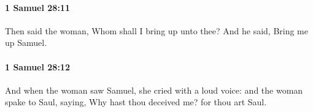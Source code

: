 		\paragraph{1 Samuel 28:11} %
			\label{1SAMUEL-28-11}

			Then said the woman, Whom shall I bring up unto thee? And he said, Bring me up Samuel.


		\paragraph{1 Samuel 28:12} %
			\label{1SAMUEL-28-12}

			And when the woman saw Samuel, she cried with a loud voice: and the woman spake to Saul, saying, Why hast thou deceived me? for thou art Saul.


